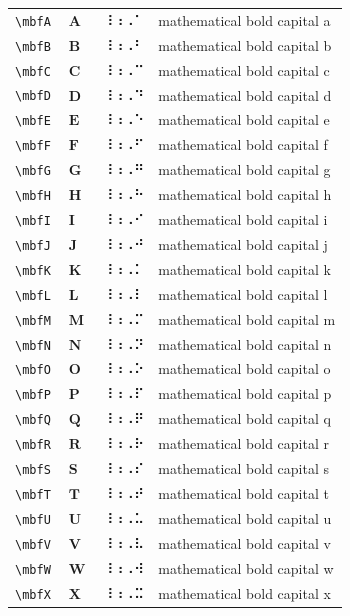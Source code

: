\documentclass[oneside]{article}
\begin{document}
\begin{longtable}{llll}
\verb|\mbfA| & $\mbfA$ &  ⠸⠰⠠⠁  & {mathematical bold capital a} \\[2ex]
\verb|\mbfB| & $\mbfB$ &  ⠸⠰⠠⠃  & {mathematical bold capital b} \\[2ex]
\verb|\mbfC| & $\mbfC$ &  ⠸⠰⠠⠉  & {mathematical bold capital c} \\[2ex]
\verb|\mbfD| & $\mbfD$ &  ⠸⠰⠠⠙  & {mathematical bold capital d} \\[2ex]
\verb|\mbfE| & $\mbfE$ &  ⠸⠰⠠⠑  & {mathematical bold capital e} \\[2ex]
\verb|\mbfF| & $\mbfF$ &  ⠸⠰⠠⠋  & {mathematical bold capital f} \\[2ex]
\verb|\mbfG| & $\mbfG$ &  ⠸⠰⠠⠛  & {mathematical bold capital g} \\[2ex]
\verb|\mbfH| & $\mbfH$ &  ⠸⠰⠠⠓  & {mathematical bold capital h} \\[2ex]
\verb|\mbfI| & $\mbfI$ &  ⠸⠰⠠⠊  & {mathematical bold capital i} \\[2ex]
\verb|\mbfJ| & $\mbfJ$ &  ⠸⠰⠠⠚  & {mathematical bold capital j} \\[2ex]
\verb|\mbfK| & $\mbfK$ &  ⠸⠰⠠⠅  & {mathematical bold capital k} \\[2ex]
\verb|\mbfL| & $\mbfL$ &  ⠸⠰⠠⠇  & {mathematical bold capital l} \\[2ex]
\verb|\mbfM| & $\mbfM$ &  ⠸⠰⠠⠍  & {mathematical bold capital m} \\[2ex]
\verb|\mbfN| & $\mbfN$ &  ⠸⠰⠠⠝  & {mathematical bold capital n} \\[2ex]
\verb|\mbfO| & $\mbfO$ &  ⠸⠰⠠⠕  & {mathematical bold capital o} \\[2ex]
\verb|\mbfP| & $\mbfP$ &  ⠸⠰⠠⠏  & {mathematical bold capital p} \\[2ex]
\verb|\mbfQ| & $\mbfQ$ &  ⠸⠰⠠⠟  & {mathematical bold capital q} \\[2ex]
\verb|\mbfR| & $\mbfR$ &  ⠸⠰⠠⠗  & {mathematical bold capital r} \\[2ex]
\verb|\mbfS| & $\mbfS$ &  ⠸⠰⠠⠎  & {mathematical bold capital s} \\[2ex]
\verb|\mbfT| & $\mbfT$ &  ⠸⠰⠠⠞  & {mathematical bold capital t} \\[2ex]
\verb|\mbfU| & $\mbfU$ &  ⠸⠰⠠⠥  & {mathematical bold capital u} \\[2ex]
\verb|\mbfV| & $\mbfV$ &  ⠸⠰⠠⠧  & {mathematical bold capital v} \\[2ex]
\verb|\mbfW| & $\mbfW$ &  ⠸⠰⠠⠺  & {mathematical bold capital w} \\[2ex]
\verb|\mbfX| & $\mbfX$ &  ⠸⠰⠠⠭  & {mathematical bold capital x} \\[2ex]

\end{longtable}
\end{document}
